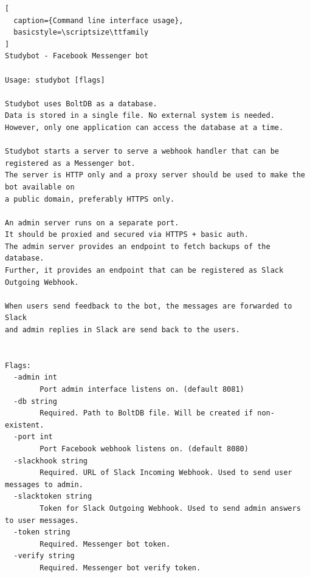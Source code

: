 \begin{lstlisting}[
  caption={Command line interface usage},
  basicstyle=\scriptsize\ttfamily
]
Studybot - Facebook Messenger bot

Usage: studybot [flags]

Studybot uses BoltDB as a database.
Data is stored in a single file. No external system is needed.
However, only one application can access the database at a time.

Studybot starts a server to serve a webhook handler that can be registered as a Messenger bot.
The server is HTTP only and a proxy server should be used to make the bot available on
a public domain, preferably HTTPS only.

An admin server runs on a separate port.
It should be proxied and secured via HTTPS + basic auth.
The admin server provides an endpoint to fetch backups of the database.
Further, it provides an endpoint that can be registered as Slack Outgoing Webhook.

When users send feedback to the bot, the messages are forwarded to Slack
and admin replies in Slack are send back to the users.


Flags:
  -admin int
    	Port admin interface listens on. (default 8081)
  -db string
    	Required. Path to BoltDB file. Will be created if non-existent.
  -port int
    	Port Facebook webhook listens on. (default 8080)
  -slackhook string
    	Required. URL of Slack Incoming Webhook. Used to send user messages to admin.
  -slacktoken string
    	Token for Slack Outgoing Webhook. Used to send admin answers to user messages.
  -token string
    	Required. Messenger bot token.
  -verify string
    	Required. Messenger bot verify token.
\end{lstlisting}


